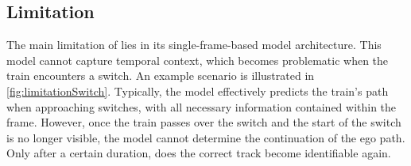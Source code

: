 \subsection{Limitation}
\label{sec:limitationBaseline}

The main limitation of \cite{tepNet2024} lies in its single-frame-based model architecture.
This model cannot capture temporal context, which becomes problematic when the train encounters a switch.
An example scenario is illustrated in \autoref{fig:limitationSwitch}.
Typically, the model effectively predicts the train's path when approaching switches, with all necessary information contained within the frame.
However, once the train passes over the switch and the start of the switch is no longer visible, the model cannot determine the continuation of the ego path.
Only after a certain duration, does the correct track become identifiable again.

